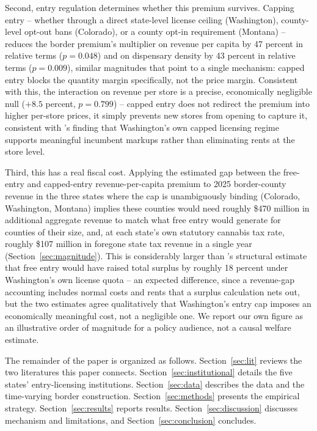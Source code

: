 \documentclass[12pt]{article}
\begin{document}
Second, entry regulation determines whether this premium survives. Capping entry -- whether through a direct
state-level license ceiling (Washington), county-level opt-out bans (Colorado), or a county opt-in requirement
(Montana) -- reduces the border premium's multiplier on revenue per capita by 47 percent in relative terms
($p=0.048$) and on dispensary density by 43 percent in relative terms ($p=0.009$), similar magnitudes
that point to a single mechanism: capped entry blocks the quantity margin specifically, not the price margin.
Consistent with this, the interaction on revenue per store is a precise, economically negligible null ($+8.5$
percent, $p=0.799$) -- capped entry does not redirect the premium into higher per-store prices, it simply
prevents new stores from opening to capture it, consistent with \citet{HollenbeckUetake2021}'s finding that
Washington's own capped licensing regime supports meaningful incumbent markups rather than eliminating rents
at the store level.

Third, this has a real fiscal cost. Applying the estimated gap between the free-entry and capped-entry
revenue-per-capita premium to 2025 border-county revenue in the three states where the cap is unambiguously
binding (Colorado, Washington, Montana) implies these counties would need roughly \$470 million in additional
aggregate revenue to match what free entry would generate for counties of their size, and, at each state's own
statutory cannabis tax rate, roughly \$107 million in foregone state tax revenue in a single year
(Section~\ref{sec:magnitude}). This is considerably larger than \citet{Thomas2019LicenseQuotas}'s structural
estimate that free entry would have raised total surplus by roughly 18 percent under Washington's own license
quota -- an expected difference, since a revenue-gap accounting includes normal costs and rents that a surplus
calculation nets out, but the two estimates agree qualitatively that Washington's entry cap imposes an
economically meaningful cost, not a negligible one. We report our own figure as an illustrative order of
magnitude for a policy audience, not a causal welfare estimate.

The remainder of the paper is organized as follows. Section~\ref{sec:lit} reviews the two literatures this
paper connects. Section~\ref{sec:institutional} details the five states' entry-licensing institutions.
Section~\ref{sec:data} describes the data and the time-varying border construction. Section~\ref{sec:methods}
presents the empirical strategy. Section~\ref{sec:results} reports results. Section~\ref{sec:discussion}
discusses mechanism and limitations, and Section~\ref{sec:conclusion} concludes.
\end{document}
